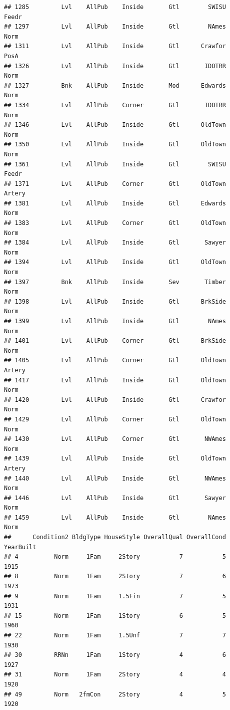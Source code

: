 \documentclass[]{article}
\begin{document}
\begin{verbatim}
## 1285         Lvl    AllPub    Inside       Gtl        SWISU      Feedr
## 1297         Lvl    AllPub    Inside       Gtl        NAmes       Norm
## 1311         Lvl    AllPub    Inside       Gtl      Crawfor       PosA
## 1326         Lvl    AllPub    Inside       Gtl       IDOTRR       Norm
## 1327         Bnk    AllPub    Inside       Mod      Edwards       Norm
## 1334         Lvl    AllPub    Corner       Gtl       IDOTRR       Norm
## 1346         Lvl    AllPub    Inside       Gtl      OldTown       Norm
## 1350         Lvl    AllPub    Inside       Gtl      OldTown       Norm
## 1361         Lvl    AllPub    Inside       Gtl        SWISU      Feedr
## 1371         Lvl    AllPub    Corner       Gtl      OldTown     Artery
## 1381         Lvl    AllPub    Inside       Gtl      Edwards       Norm
## 1383         Lvl    AllPub    Corner       Gtl      OldTown       Norm
## 1384         Lvl    AllPub    Inside       Gtl       Sawyer       Norm
## 1394         Lvl    AllPub    Inside       Gtl      OldTown       Norm
## 1397         Bnk    AllPub    Inside       Sev       Timber       Norm
## 1398         Lvl    AllPub    Inside       Gtl      BrkSide       Norm
## 1399         Lvl    AllPub    Inside       Gtl        NAmes       Norm
## 1401         Lvl    AllPub    Corner       Gtl      BrkSide       Norm
## 1405         Lvl    AllPub    Corner       Gtl      OldTown     Artery
## 1417         Lvl    AllPub    Inside       Gtl      OldTown       Norm
## 1420         Lvl    AllPub    Inside       Gtl      Crawfor       Norm
## 1429         Lvl    AllPub    Corner       Gtl      OldTown       Norm
## 1430         Lvl    AllPub    Corner       Gtl       NWAmes       Norm
## 1439         Lvl    AllPub    Inside       Gtl      OldTown     Artery
## 1440         Lvl    AllPub    Inside       Gtl       NWAmes       Norm
## 1446         Lvl    AllPub    Inside       Gtl       Sawyer       Norm
## 1459         Lvl    AllPub    Inside       Gtl        NAmes       Norm
##      Condition2 BldgType HouseStyle OverallQual OverallCond YearBuilt
## 4          Norm     1Fam     2Story           7           5      1915
## 8          Norm     1Fam     2Story           7           6      1973
## 9          Norm     1Fam     1.5Fin           7           5      1931
## 15         Norm     1Fam     1Story           6           5      1960
## 22         Norm     1Fam     1.5Unf           7           7      1930
## 30         RRNn     1Fam     1Story           4           6      1927
## 31         Norm     1Fam     2Story           4           4      1920
## 49         Norm   2fmCon     2Story           4           5      1920

\end{verbatim}
\end{document}
